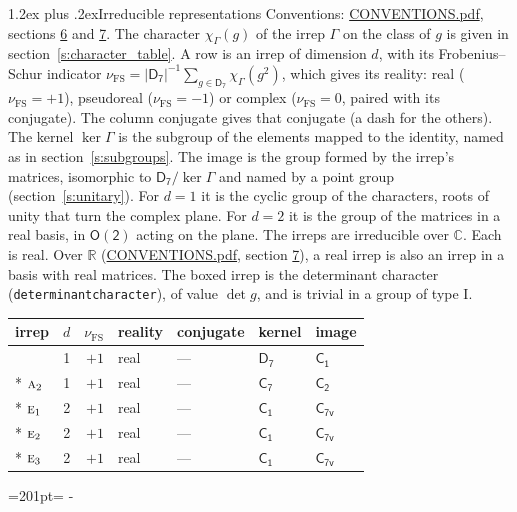 \documentclass[10pt,a4paper]{article}
\makeatletter
\renewcommand\section{\@startsection{section}{1}{\z@}{-3ex plus -1ex minus -.2ex}%
  {1.2ex plus .2ex}{\normalfont\large\sffamily\bfseries\color{parttitle}}}
\newcommand{\needspace}[1]{\par\penalty-100\begingroup\dimen0=#1\relax\dimen2=\pagegoal
  \advance\dimen2-\pagetotal\ifdim\dimen0>\dimen2\relax\ifdim\dimen2>0pt\vfil\break\fi\fi
  \endgroup}
\numberwithin{equation}{section}
\newcommand{\grp}[1]{\mathsf{#1}}
\newcommand{\irr}[1]{\text{\normalfont\scshape #1}}
\newcommand{\detbox}[1]{{\setlength{\fboxsep}{1pt}\fbox{#1}}}
\newcommand{\irchar}[1]{\chi_{#1}}
\newcommand{\fsind}{\nu_{\mathrm{FS}}}
\makeatother
\begin{document}
\section{Irreducible representations}\label{s:irreps}
Conventions: \href{../../CONVENTIONS.pdf}{CONVENTIONS.pdf}, sections \href{../../CONVENTIONS.pdf\#conv.6}{6} and \href{../../CONVENTIONS.pdf\#conv.7}{7}.
\leavevmode\label{n:function.character}\label{n:irrep.Gamma}The character $\irchar{\Gamma}(g)$ of the irrep $\Gamma$ on the class of $g$ is given in section~\ref{s:character_table}.
\leavevmode\label{n:index.dimension}\label{n:index.frobenius}\label{n:head.irrep}\label{n:head.reality}A row is an irrep of dimension $d$, with its Frobenius--Schur indicator $\fsind = |\grp{D_{7}}|^{-1}\allowbreak\sum_{g\in\grp{D_{7}}}\irchar{\Gamma}(g^2)$, which gives its reality: real ($\fsind = +1$), pseudoreal ($\fsind = -1$) or complex ($\fsind = 0$, paired with its conjugate). \label{n:head.conjugate}The column conjugate gives that conjugate (a dash for the others). \label{n:head.kernel}The kernel $\ker\Gamma$ is the subgroup of the elements mapped to the identity, named as in section~\ref{s:subgroups}. \label{n:head.image}The image is the group formed by the irrep's matrices, isomorphic to $\grp{D_{7}}/\ker\Gamma$ and named by a point group (section~\ref{s:unitary}). For $d = 1$ it is the cyclic group of the characters, roots of unity that turn the complex plane. For $d = 2$ it is the group of the matrices in a real basis, in $\grp{O(2)}$ acting on the plane. The irreps are irreducible over $\mathbb{C}$. Each is real. Over $\mathbb{R}$ (\href{../../CONVENTIONS.pdf}{CONVENTIONS.pdf}, section \href{../../CONVENTIONS.pdf\#conv.7}{7}), a real irrep is also an irrep in a basis with real matrices. \label{n:mark.determinant}The boxed irrep is the determinant character (\texttt{determinantcharacter}), of value $\det g$, and is trivial in a group of type I.
\setlength{\emergencystretch}{2em}\par\setlength{\emergencystretch}{0pt}
{\small\renewcommand{\arraystretch}{1.25}\begin{longtable}{@{}lrrllll@{}}\toprule
irrep & $d$ & $\fsind$ & reality & conjugate & kernel & image\\\midrule\endhead
\bottomrule\endfoot\endlastfoot
\detbox{$\irr{a}_{1}$} & 1 & $+1$ & real & --- & \href{D7.pdf}{$\grp{D_{7}}$} & \href{C1.pdf}{$\grp{C_{1}}$}\\*
$\irr{a}_{2}$ & 1 & $+1$ & real & --- & \href{C7.pdf}{$\grp{C_{7}}$} & \href{C2.pdf}{$\grp{C_{2}}$}\\*
$\irr{e}_{1}$ & 2 & $+1$ & real & --- & \href{C1.pdf}{$\grp{C_{1}}$} & \href{C7v.pdf}{$\grp{C_{7v}}$}\\*
$\irr{e}_{2}$ & 2 & $+1$ & real & --- & \href{C1.pdf}{$\grp{C_{1}}$} & \href{C7v.pdf}{$\grp{C_{7v}}$}\\*
$\irr{e}_{3}$ & 2 & $+1$ & real & --- & \href{C1.pdf}{$\grp{C_{1}}$} & \href{C7v.pdf}{$\grp{C_{7v}}$}\\
\bottomrule\end{longtable}}
\needspace{201pt}
\end{document}
